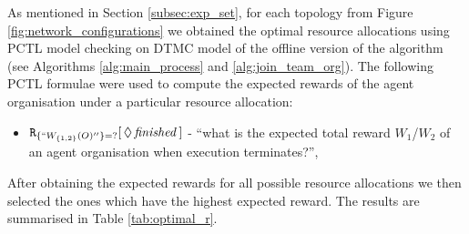 \documentclass{llncs}
\begin{document}
\begin{table}
\centering
{}

\caption{Model comparison for different number of agents in a fully connected agent organisation and different models for offline version of the Algorithm \ref{alg:main_process}.}
\label{tab:model_sizes}
\end{table}

As mentioned in Section \ref{subsec:exp_set}, for each topology from Figure \ref{fig:network_configurations} we obtained the optimal resource allocations using PCTL model checking on DTMC model of the offline version of the algorithm (see Algorithms \ref{alg:main_process} and \ref{alg:join_team_org}). The following PCTL formulae were used to compute the expected rewards of the agent organisation under a particular resource allocation:
\begin{itemize}
 \item ${\tt R}_{\{``W_{\{1,2\}}(O)''\}=?}[\,\Diamond\,\mathit{finished}\,]$ -
``what is the expected total reward  $W_1$/$W_2$ of an agent organisation when execution terminates?'',
\end{itemize}
After obtaining the expected rewards for all possible resource allocations we then selected the ones which have the highest expected reward. The results are summarised in Table \ref{tab:optimal_r}.
\end{document}
